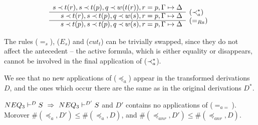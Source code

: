 \begin{PROOF}
\begin{LS}
\[%
 \begin{array}{rl}
s\Incl t(r), s\Incl t(p), q\Incl w(t(r)), r=p, \GSD \\ \cline{1-1}
s\Incl t(r), s\Incl t(p), q\Incl w(s), r=p, \GSD & \rabove{(\Incl_a^*)} \\ \cline{1-1}
s\Incl t(p), s\Incl t(p), q\Incl w(s), r=p, \GSD & \rabove{(=_{Ra})} \end{array} \]
%
\item The rules ($=_s$), ($E_s$) and ($cut_t$) can be trivially swapped, since they do
not affect the antecedent -- the active formula, which is either equality or
disappears, cannot be involved in the final application of ($\mathbin{\prec}_a^*$).
\end{LS}
We see that no new applications of ($\preceq_a$) appear in the transformed derivations 
$D$, and the ones which occur there are the same as in the original derivations $D^*$.
\end{PROOF}
%
\begin{LEMMA}\label{le:noeqeq}
 ${NEQ_3}\vdash^{{D}}S\ \mathrel\Rightarrow\ {NEQ_3}\vdash^{{D'}}S$ and $D'$ contains no applications
 of ($=_{a=}$). Morover $\#(\preceq_a,D')\leq \#(\preceq_a,D)$, and
$\#(\preceq_{anr},D')\leq \#(\preceq_{anr},D)$.
\end{LEMMA}
